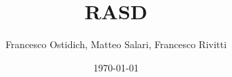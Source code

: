 
\title{\Huge RASD}
\author{Francesco Ostidich, Matteo Salari, Francesco Rivitti}
\date{\today}
\maketitle
\vspace{12mm}
\tableofcontents
\newpage

